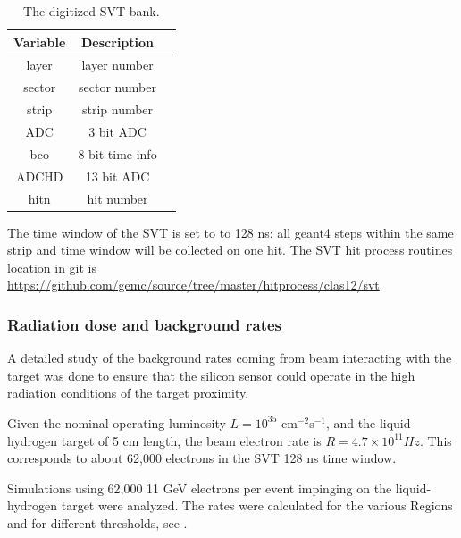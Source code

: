 \begin{table}[h]
	\begin{center}
		\begin{tabular}{| c | c | c |}
			\hline \hline
			Variable  & Description   \\
			\hline
               layer  &        layer number    \\
              sector  &       sector number    \\
               strip  &        strip number    \\
                 ADC  &           3 bit ADC    \\
                 bco  &     8 bit time info    \\
               ADCHD  &          13 bit ADC    \\
                hitn  &          hit number    \\
			\hline \hline
		\end{tabular}
	\end{center}
	\caption{The digitized SVT bank.}\label{tab:bstBank}
\end{table}

\noindent The time window  of the SVT is set to to 128 ns: all geant4 steps within the same strip and time window will be collected on one hit.
The SVT hit process routines location in git is \url{https://github.com/gemc/source/tree/master/hitprocess/clas12/svt}

\subsubsection{Radiation dose and background rates}
A detailed study of the background rates coming from beam interacting with the target was done to ensure that the silicon sensor
could operate in the high radiation conditions of the target proximity.

Given the nominal operating luminosity $L=10^{35}$ cm$^{-2}$s$^{-1}$, and the liquid-hydrogen target of 5 cm length, the beam electron rate
is $R=4.7 \times 10^{11} Hz$. This corresponds to about 62,000 electrons in the SVT 128 ns time window.

Simulations using 62,000 11 GeV electrons per event impinging on the liquid-hydrogen target were analyzed.
The rates were calculated for the various Regions and for different thresholds, see .


